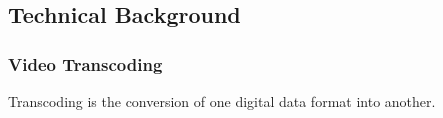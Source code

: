 \documentclass[12pt,a4paper]{article}
\begin{document}
%

















\newpage

\subsection{Technical Background} \label{subsection:technicalbackground}

\subsubsection*{Video Transcoding} 

Transcoding is the conversion of one digital data format into another.~\cite{transcoding}
\end{document}
